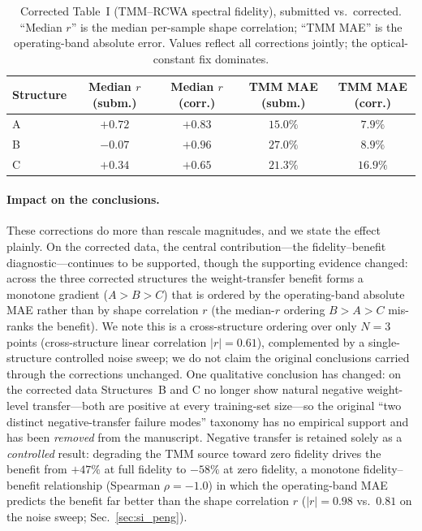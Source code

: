 \documentclass[11pt]{article}
\begin{document}
\begin{table}[htbp]\centering\small
\caption{Corrected Table~I (TMM--RCWA spectral fidelity), submitted vs.\
corrected. ``Median $r$'' is the median per-sample shape correlation; ``TMM MAE''
is the operating-band absolute error. Values reflect all corrections jointly; the
optical-constant fix dominates.}
\label{tab:si_table1_corrected}
\begin{tabular}{lcccc}\toprule
\textbf{Structure} & \textbf{Median $r$ (subm.)} & \textbf{Median $r$ (corr.)} & \textbf{TMM MAE (subm.)} & \textbf{TMM MAE (corr.)}\\\midrule
A & $+0.72$ & $+0.83$ & $15.0\%$ & $7.9\%$\\
B & $-0.07$ & $+0.96$ & $27.0\%$ & $8.9\%$\\
C & $+0.34$ & $+0.65$ & $21.3\%$ & $16.9\%$\\\bottomrule
\end{tabular}
\end{table}

\paragraph{Impact on the conclusions.} These corrections do more than rescale
magnitudes, and we state the effect plainly. On the corrected data, the central
contribution---the fidelity--benefit diagnostic---continues to be supported,
though the supporting evidence changed: across the three corrected structures the
weight-transfer benefit forms a monotone gradient ($A>B>C$) that is ordered by the
operating-band absolute MAE rather than by shape correlation $r$ (the median-$r$
ordering $B>A>C$ mis-ranks the benefit). We note this is a cross-structure
ordering over only $N{=}3$ points (cross-structure linear correlation $|r|=0.61$),
complemented by a single-structure controlled noise sweep; we do not claim the
original conclusions carried through the corrections unchanged. One qualitative conclusion has changed:
on the corrected data Structures~B and C no longer show natural negative
weight-level transfer---both are positive at every training-set size---so the
original ``two distinct negative-transfer failure modes'' taxonomy has no empirical
support and has been \emph{removed} from the manuscript. Negative transfer is
retained solely as a \emph{controlled} result: degrading the TMM source toward zero
fidelity drives the benefit from $+47\%$ at full fidelity to $-58\%$ at zero
fidelity, a monotone fidelity--benefit relationship (Spearman $\rho=-1.0$) in which
the operating-band MAE predicts the benefit far better than the shape correlation
$r$ ($|r|=0.98$ vs.\ $0.81$ on the noise sweep; Sec.~\ref{sec:si_peng}).
\end{document}

